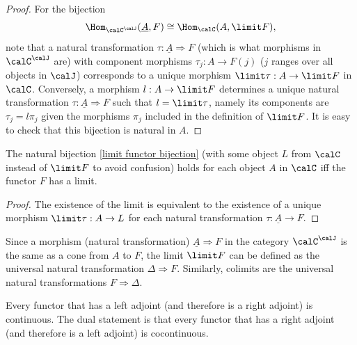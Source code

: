 \begin{proof}
    For the bijection 
    \[
        \Hom_{\calC ^\calJ }(\underline{A},F)\cong \Hom_{\calC }(A,\limit F),\label{limit functor bijection}
    \]
    note that a natural transformation $\tau: \underline{A}\Longrightarrow F$ (which is what morphisms in $\calC ^\calJ $ are) with component morphisms $\tau_j:A\to F(j)$ ($j$ ranges over all objects in $\calJ $) corresponds to a unique morphism $\limit \tau: A\to \limit F$ in $\calC $. Conversely, a morphism $l:A\to \limit F$ determines a unique natural transformation $\tau:\underline{A}\Longrightarrow F$ such that $l=\limit \tau$, namely its components are $\tau_j=l\pi_j$ given the morphisms $\pi_j$ included in the definition of $\limit F$. It is easy to check that this bijection is natural in $A$.
\end{proof}
\begin{cor}\label{corollary on limits}
    The natural bijection \eqref{limit functor bijection} (with some object $L$ from $\calC $ instead of $\limit F$ to avoid confusion) holds for each object $A$ in $\calC $ iff the functor $F$ has a limit.
\end{cor}
\begin{proof}
    The existence of the limit is equivalent to the existence of a unique morphism $\limit \tau: A\to L$ for each natural transformation $\tau:\underline{A}\to F$.
\end{proof}
\begin{rem}
    Since a morphism (natural transformation) $\underline{A}\Longrightarrow F$ in the category $\calC ^\calJ $ is the same as a cone from $A$ to $F$, the limit $\limit F$ can be defined as the universal natural transformation $\Delta \Longrightarrow F$. Similarly, colimits are the universal natural transformations $F\Longrightarrow \Delta$.
\end{rem}
\begin{thm}\label{continuity of adjoints thm}
    Every functor that has a left adjoint (and therefore is a right adjoint) is continuous. The dual statement is that every functor that has a right adjoint (and therefore is a left adjoint) is cocontinuous.
\end{thm}
